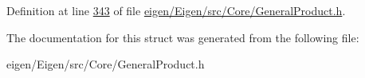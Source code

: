 Definition at line \hyperlink{eigen_2_eigen_2src_2_core_2_general_product_8h_source_l00343}{343} of file \hyperlink{eigen_2_eigen_2src_2_core_2_general_product_8h_source}{eigen/\+Eigen/src/\+Core/\+General\+Product.\+h}.



The documentation for this struct was generated from the following file\+:\begin{DoxyCompactItemize}
\item 
eigen/\+Eigen/src/\+Core/\+General\+Product.\+h\end{DoxyCompactItemize}
